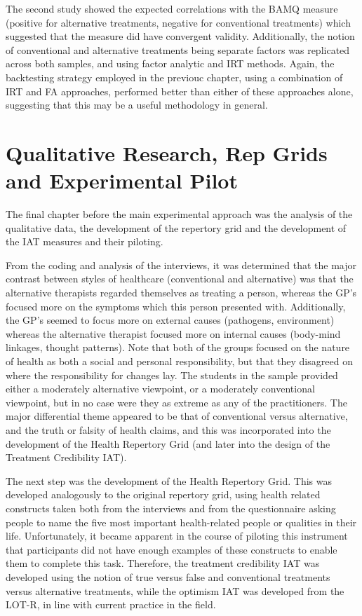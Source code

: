 The second study showed the expected correlations  with the BAMQ measure (positive for alternative treatments, negative for conventional treatments) which suggested that the measure did have convergent validity. Additionally, the notion of conventional and alternative treatments being separate factors was replicated across both samples, and using factor analytic and IRT methods. Again, the backtesting strategy employed in the previouc chapter, using a combination of IRT and FA approaches, performed better than either of these approaches alone, suggesting that this may be a useful methodology in general. 


\section{Qualitative Research, Rep Grids and Experimental Pilot}
\label{sec:qual-rese-rep}

The final chapter before the main experimental approach was the analysis of the qualitative data, the development of the repertory grid and the development of the IAT measures and their piloting. 

From the coding and analysis of the interviews, it was determined that the major contrast between styles of healthcare (conventional and alternative) was that the alternative therapists regarded themselves as treating a person, whereas the GP's focused more on the symptoms which this person presented with. Additionally, the GP's seemed to focus more on external causes (pathogens, environment) whereas the alternative therapist focused more on internal causes (body-mind linkages, thought patterns). Note that both of the groups focused on the nature of health as both a social and personal responsibility, but that they disagreed on where the responsibility for changes lay. The students in the sample provided either a moderately alternative viewpoint, or a moderately conventional viewpoint, but in no case were they as extreme as any of the practitioners. The major differential theme appeared to be that of conventional versus alternative, and the truth or falsity of health claims, and this was incorporated into the development of the Health Repertory Grid (and later into the design of the Treatment Credibility IAT). 

The next step was the development of the Health Repertory Grid. This was developed analogously to the original repertory grid, using health related constructs taken both from the interviews and from the questionnaire asking people to name the five most important health-related people or qualities in their life. Unfortunately, it became apparent in the course of piloting this instrument that participants did not have enough examples of these constructs to enable them to complete this task. Therefore, the treatment credibility IAT was developed using the notion of true versus false and conventional treatments versus alternative treatments, while the optimism IAT was developed from the LOT-R, in line with current practice in the field. 

